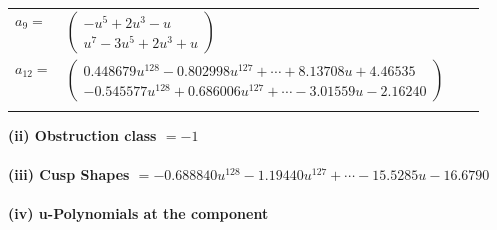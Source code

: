 \documentclass[1p]{elsarticle_modified}
\theoremstyle{definition}
\begin{document}
\begin{tabular}{m{7pt} m{180pt} m{7pt} m{180pt} }
\flushright $a_{9}=$&$\begin{pmatrix}- u^5+2 u^3- u\\u^7-3 u^5+2 u^3+u\end{pmatrix}$ \\
\flushright $a_{12}=$&$\begin{pmatrix}0.448679 u^{128}-0.802998 u^{127}+\cdots+8.13708 u+4.46535\\-0.545577 u^{128}+0.686006 u^{127}+\cdots-3.01559 u-2.16240\end{pmatrix}$\\&\end{tabular}
\flushleft \textbf{(ii) Obstruction class $= -1$}\\~\\
\flushleft \textbf{(iii) Cusp Shapes $= -0.688840 u^{128}-1.19440 u^{127}+\cdots-15.5285 u-16.6790$}\\~\\
\newpage\renewcommand{\arraystretch}{1}
\flushleft \textbf{(iv) u-Polynomials at the component}\newline \\
\end{document}
